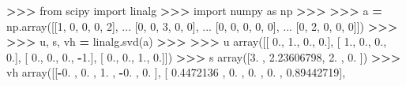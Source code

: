 \documentclass[
]{book}
\newenvironment{Shaded}{\begin{snugshade}}{\end{snugshade}}
\newcommand{\DecValTok}[1]{\textcolor[rgb]{0.00,0.00,0.81}{#1}}
\newcommand{\FloatTok}[1]{\textcolor[rgb]{0.00,0.00,0.81}{#1}}
\newcommand{\ImportTok}[1]{#1}
\newcommand{\NormalTok}[1]{#1}
\newcommand{\OperatorTok}[1]{\textcolor[rgb]{0.81,0.36,0.00}{\textbf{#1}}}
\begin{document}
\begin{Shaded}
\begin{Highlighting}[]
\OperatorTok{\textgreater{}\textgreater{}\textgreater{}} \ImportTok{from}\NormalTok{ scipy }\ImportTok{import}\NormalTok{ linalg}
\OperatorTok{\textgreater{}\textgreater{}\textgreater{}} \ImportTok{import}\NormalTok{ numpy }\ImportTok{as}\NormalTok{ np}
\OperatorTok{\textgreater{}\textgreater{}\textgreater{}}
\OperatorTok{\textgreater{}\textgreater{}\textgreater{}}\NormalTok{ a }\OperatorTok{=}\NormalTok{ np.array([[}\DecValTok{1}\NormalTok{, }\DecValTok{0}\NormalTok{, }\DecValTok{0}\NormalTok{, }\DecValTok{0}\NormalTok{, }\DecValTok{2}\NormalTok{],}
\NormalTok{...               [}\DecValTok{0}\NormalTok{, }\DecValTok{0}\NormalTok{, }\DecValTok{3}\NormalTok{, }\DecValTok{0}\NormalTok{, }\DecValTok{0}\NormalTok{],}
\NormalTok{...               [}\DecValTok{0}\NormalTok{, }\DecValTok{0}\NormalTok{, }\DecValTok{0}\NormalTok{, }\DecValTok{0}\NormalTok{, }\DecValTok{0}\NormalTok{],}
\NormalTok{...               [}\DecValTok{0}\NormalTok{, }\DecValTok{2}\NormalTok{, }\DecValTok{0}\NormalTok{, }\DecValTok{0}\NormalTok{, }\DecValTok{0}\NormalTok{]])}
\OperatorTok{\textgreater{}\textgreater{}\textgreater{}}
\OperatorTok{\textgreater{}\textgreater{}\textgreater{}}\NormalTok{ u, s, vh }\OperatorTok{=}\NormalTok{ linalg.svd(a)}
\OperatorTok{\textgreater{}\textgreater{}\textgreater{}}
\OperatorTok{\textgreater{}\textgreater{}\textgreater{}}\NormalTok{ u}
\NormalTok{array([[ }\FloatTok{0.}\NormalTok{,  }\FloatTok{1.}\NormalTok{,  }\FloatTok{0.}\NormalTok{,  }\FloatTok{0.}\NormalTok{],}
\NormalTok{       [ }\FloatTok{1.}\NormalTok{,  }\FloatTok{0.}\NormalTok{,  }\FloatTok{0.}\NormalTok{,  }\FloatTok{0.}\NormalTok{],}
\NormalTok{       [ }\FloatTok{0.}\NormalTok{,  }\FloatTok{0.}\NormalTok{,  }\FloatTok{0.}\NormalTok{, }\OperatorTok{{-}}\FloatTok{1.}\NormalTok{],}
\NormalTok{       [ }\FloatTok{0.}\NormalTok{,  }\FloatTok{0.}\NormalTok{,  }\FloatTok{1.}\NormalTok{,  }\FloatTok{0.}\NormalTok{]])}
\OperatorTok{\textgreater{}\textgreater{}\textgreater{}}\NormalTok{ s}
\NormalTok{array([}\FloatTok{3.}\NormalTok{        , }\FloatTok{2.23606798}\NormalTok{, }\FloatTok{2.}\NormalTok{        , }\FloatTok{0.}\NormalTok{        ])}
\OperatorTok{\textgreater{}\textgreater{}\textgreater{}}\NormalTok{ vh}
\NormalTok{array([[}\OperatorTok{{-}}\FloatTok{0.}\NormalTok{        ,  }\FloatTok{0.}\NormalTok{        ,  }\FloatTok{1.}\NormalTok{        , }\OperatorTok{{-}}\FloatTok{0.}\NormalTok{        ,  }\FloatTok{0.}\NormalTok{        ],}
\NormalTok{       [ }\FloatTok{0.4472136}\NormalTok{ ,  }\FloatTok{0.}\NormalTok{        ,  }\FloatTok{0.}\NormalTok{        ,  }\FloatTok{0.}\NormalTok{        ,  }\FloatTok{0.89442719}\NormalTok{],}

\end{Highlighting}
\end{Shaded}
\end{document}
